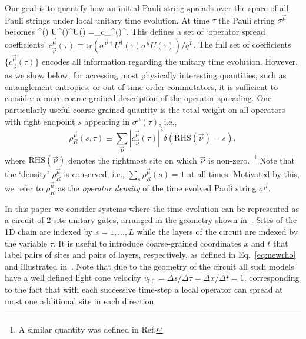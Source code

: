 \documentclass[aps,prb,twocolumn,superscriptaddress]{revtex4-1}
\begin{document}
Our goal is to quantify how an initial Pauli string spreads over the space of all Pauli strings under local unitary time evolution. At time $\tau$ the Pauli string $\sigma^{\vec{\mu}}$ becomes
\be\label{eq:cmunudef}
\sigma^{\vec{\mu}}\left(\tau \right)  \equiv U^{\dagger}(\tau)\sigma^{\vec{\mu}}U(\tau)  =\sum_{\nu}c_{\vec{\nu}}^{\vec{\mu}}\left(\tau\right)\sigma^{\vec{\nu}}.
\ee
This defines a set of `operator spread coefficients' $c_{\vec{\nu}}^{\vec{\mu}}\left(\tau\right)\equiv\text{tr}\left(\sigma^{\vec{\nu}\dagger}U^{\dagger}(\tau)\sigma^{\vec{\mu}}U(\tau)\right) / q^L$. The full set of coefficients $\{c_{\vec{\nu}}^{\vec{\mu}}(\tau)\}$ encodes all information regarding the unitary time evolution. However, as we show below, for accessing most physically interesting quantities, such as entanglement entropies\cite{Abanin17,Mezei16,Nahum16}, or out-of-time-order commutators, it is sufficient to consider a more coarse-grained description of the operator spreading. One particularly useful coarse-grained quantity is the total weight on all operators with right endpoint $s$ appearing in $\sigma^\mu(\tau)$, i.e.,
\begin{equation}\label{eq:rho_def}
\rho_R^{\vec{\mu}}(s,\tau) \equiv \sum_{\vec{\nu}} \left|c_{\vec{\nu}}^{\vec{\mu}}\left(\tau\right)\right|^{2} \delta(\text{RHS}(\vec{\nu}) = s),
\end{equation}
where $\text{RHS}(\vec{\nu})$ denotes the rightmost site on which $\vec{\nu}$ is non-zero.~\footnote{A similar quantity was defined in Ref. } Note that the `density' $\rho^{\vec{\mu}}_R$ is conserved, i.e., $\sum_s \rho^{\vec{\mu}}_R(s) = 1$ at all times. Motivated by this, we refer to $\rho_R^{\vec{\mu}}$ as the \emph{operator density} of the time evolved Pauli string $\sigma^{\vec{\mu}}$.

In this paper we consider systems where the time evolution can be represented as a circuit of 2-site unitary gates, arranged in the geometry shown in~. Sites of the 1D chain are indexed by $s=1,\ldots,L$ while the layers of the circuit are indexed by the variable $\tau$. It is useful to introduce coarse-grained coordinates $x$ and $t$ that label pairs of sites and pairs of layers, respectively, as defined in Eq.~\eqref{eq:newrho} and illustrated in~. Note that due to the geometry of the circuit all such models have a well defined light cone velocity $v_\text{LC} = \Delta s/\Delta\tau = \Delta x/\Delta t = 1$, corresponding to the fact that with each successive time-step a local operator can spread at most one additional site in each direction.
\end{document}
